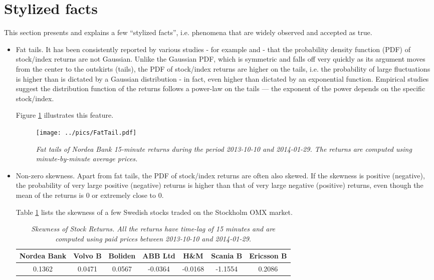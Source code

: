 \documentclass{report}
\begin{document}
\section{Stylized facts}\label{sec:StylizedFacts}
This section presents and explains a few ``stylized facts'',
i.e. phenomena that are widely observed and accepted as true.
\begin{itemize}
\item Fat tails. It has been consistently reported by various studies
  - for example \cite{Potters2003} and \cite{Mantegna2000} - that the
  probability density function (PDF) of stock/index returns are not
  Gaussian. Unlike the Gaussian PDF, which is symmetric and falls off
  very quickly as its argument moves from the center to the outskirts
  (tails), the PDF of stock/index returns are higher on the tails,
  i.e. the probability of large fluctuations is higher than is dictated
  by a Gaussian distribution - in fact, even higher than dictated by
  an exponential function. Empirical studies suggest the distribution
  function of the returns follows a power-law on the tails --- the
  exponent of the power depends on the specific stock/index.

  Figure \ref{fig:FatTail} illustrates this feature.
  \begin{figure}[htb!]
    \centering
    \texttt{[image: ../pics/FatTail.pdf]}
    \caption{\small \it Fat tails of {\it Nordea Bank} 15-minute
      returns during the period 2013-10-10 and 2014-01-29. The returns
      are computed using minute-by-minute average prices.}
    \label{fig:FatTail}
  \end{figure}

\item Non-zero skewness. Apart from fat tails, the PDF of stock/index
  returns are often also skewed. If the skewness is positive
  (negative), the probability of very large positive (negative)
  returns is higher than that of very large negative (positive)
  returns, even though the mean of the returns is 0 or extremely
  close to 0.

  Table \ref{tab:EmpiricalSkewness} lists the skewness of a few
  Swedish stocks traded on the Stockholm OMX market.
  \begin{table}[htb!]
    \footnotesize
    \centering
    \begin{tabular}{|c|c|c|c|c|c|c|}
      \hline
      Nordea Bank & Volvo B & Boliden & ABB Ltd & H\&M & Scania
      B & Ericsson B \\
      \hline
      0.1362 & 0.0471 & 0.0567 & -0.0364 & -0.0168 &
      -1.1554 & 0.2086 \\
      \hline
    \end{tabular}
    \caption{\small \it Skewness of Stock Returns. All the returns
      have time-lag of 15 minutes and are computed using paid prices
      between 2013-10-10 and 2014-01-29. }
    \label{tab:EmpiricalSkewness}
  \end{table}


\end{itemize}
\end{document}
